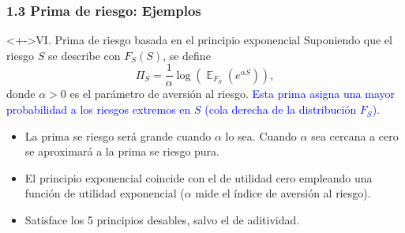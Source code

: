 \documentclass[cjk,t,compress]{beamer}
\newcommand{\field}[1]{\mathbb{#1}}
\newcommand{\expec}{\operatorname{\field{E}}}
\renewcommand{\log}{\operatorname{\text{log}}}
\begin{document}
\begin{frame}[fragile]
	\frametitle{1.3 Prima de riesgo: Ejemplos}
	\scriptsize  	
	
	\vspace{0.2cm}
	\begin{block}<+->{VI. Prima de riesgo basada en el principio exponencial}
		\vspace{0.1cm}
		Suponiendo que el riesgo $S$ se describe con $F_{S}(S)$, se define
		\begin{equation}
		\Pi_{S} = \frac{1}{\alpha}\log\left(\expec _{F_{S}}(e^{\alpha S})\right),
		\end{equation}
		donde $\alpha > 0$ es el par\'ametro de aversi\'on al riesgo.
		\newline
		\textcolor{blue}{Esta prima asigna una mayor probabilidad a los riesgos extremos en $S$ (cola derecha de la distribuci\'on $F_{S}$).}
		
		\begin{itemize}
			\item La prima se riesgo ser\'a grande cuando $\alpha$ lo sea. Cuando $\alpha$ sea cercana a cero se aproximar\'a a la prima se riesgo pura.
			\item El principio exponencial coincide con el de utilidad cero empleando una funci\'on de utilidad exponencial ($\alpha$ mide el \'indice de aversi\'on al riesgo).
			\item Satisface los 5 principios desables, salvo el de aditividad.
		\end{itemize}
	\end{block}  		
	
\end{frame}
\end{document}
